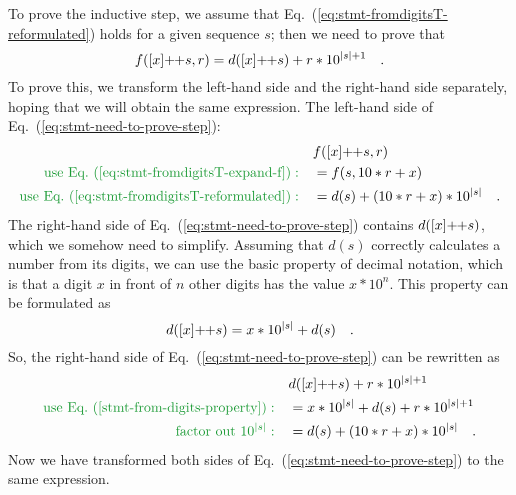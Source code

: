 To prove the inductive step, we assume that Eq.~(\ref{eq:stmt-fromdigitsT-reformulated})
holds for a given sequence $s$; then we need to prove that
\begin{equation}
f([x]\negmedspace+\negthickspace+s,r)=d([x]\negmedspace+\negthickspace+s)+r*10^{\left|s\right|+1}\quad.\label{eq:stmt-need-to-prove-step}
\end{equation}
To prove this, we transform the left-hand side and the right-hand
side separately, hoping that we will obtain the same expression. The
left-hand side of Eq.~(\ref{eq:stmt-need-to-prove-step}):
\begin{align*}
 & f([x]\negmedspace+\negthickspace+s,r)\\
{\color{greenunder}\text{use Eq.~(\ref{eq:stmt-fromdigitsT-expand-f})}:}\quad & =f(s,10*r+x)\\
{\color{greenunder}\text{use Eq.~(\ref{eq:stmt-fromdigitsT-reformulated})}:}\quad & =d(s)+\left(10*r+x\right)*10^{\left|s\right|}\quad.
\end{align*}
The right-hand side of Eq.~(\ref{eq:stmt-need-to-prove-step}) contains
$d([x]\negmedspace+\negthickspace+s)$, which we somehow need to simplify.
Assuming that $d(s)$ correctly calculates a number from its digits,
we can use the basic property of decimal notation, which is that a
digit $x$ in front of $n$ other digits has the value $x*10^{n}$.
This property can be formulated as
\begin{equation}
d([x]\negmedspace+\negthickspace+s)=x*10^{\left|s\right|}+d(s)\quad.\label{stmt-from-digits-property}
\end{equation}
So, the right-hand side of Eq.~(\ref{eq:stmt-need-to-prove-step})
can be rewritten as
\begin{align*}
 & d([x]\negmedspace+\negthickspace+s)+r*10^{\left|s\right|+1}\\
{\color{greenunder}\text{use Eq.~(\ref{stmt-from-digits-property})}:}\quad & =x*10^{\left|s\right|}+d(s)+r*10^{\left|s\right|+1}\\
{\color{greenunder}\text{factor out }10^{\left|s\right|}:}\quad & =d(s)+\left(10*r+x\right)*10^{\left|s\right|}\quad.
\end{align*}
Now we have transformed both sides of Eq.~(\ref{eq:stmt-need-to-prove-step})
to the same expression.

